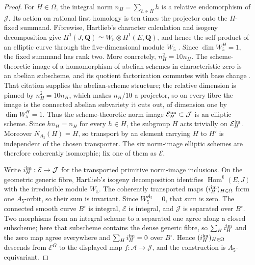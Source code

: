 \begin{proof}
For \(H\in\Omega\), the integral norm
\(n_H=\sum_{h\in H}h\) is a relative endomorphism of \(\mathcal J\).  Its
action on rational first homology is ten times the projector onto the
\(H\)-fixed summand.  Fibrewise, Hartlieb's character calculation and
isogeny decomposition give
\(H^1(J,\mathbf Q)\simeq W_5\otimes H^1(E,\mathbf Q)\), and hence the
self-product of an elliptic curve through the five-dimensional module
\(W_5\) \cite[Lemma~5.5 and Remark~5.8]{Hartlieb}.  Since
\(\dim W_5^H=1\), the fixed summand has rank two.  More concretely,
\(n_H^2=10n_H\).  The scheme-theoretic image of a homomorphism of abelian
schemes in characteristic zero is an abelian subscheme, and its quotient
factorization commutes with base change
\cite[Theorem~A]{ACMW}.  That citation supplies the abelian-scheme structure;
the relative dimension is pinned by \(n_H^2=10n_H\), which makes
\(n_H/10\) a projector, so on every fibre the image is the connected abelian
subvariety it cuts out, of dimension one by \(\dim W_5^H=1\).  Thus the
scheme-theoretic norm image \(\mathcal E_H^{\rm im}\subset\mathcal J\) is
an elliptic scheme.  Since \(hn_H=n_H\) for every
\(h\in H\), the subgroup \(H\) acts trivially on \(\mathcal E_H^{\rm im}\).  Moreover
\(N_{A_5}(H)=H\), so transport by an element carrying \(H\) to \(H'\) is
independent of the chosen transporter.  The six norm-image elliptic schemes are therefore coherently isomorphic;
fix one of them as \(\mathcal E\).

Write \(i_H^{\rm im}:\mathcal E\to\mathcal J\) for the transported
primitive norm-image inclusions.  On the geometric generic fibre, Hartlieb's isogeny decomposition
identifies \(\operatorname{Hom}^0(E,J)\) with the irreducible module \(W_5\).
The coherently transported maps \((i_H^{\rm im})_{H\in\Omega}\) form one
\(A_5\)-orbit,
so their sum is invariant.  Since \(W_5^{A_5}=0\), that sum is zero.  The
connected smooth curve \(B^\circ\) is integral, \(\mathcal E\) is integral,
and \(\mathcal J\) is separated over \(B^\circ\).  Two morphisms from an
integral scheme to a separated one agree along a closed subscheme; here that
subscheme contains the dense generic fibre, so \(\sum_Hi_H^{\rm im}\) and the zero map agree everywhere and
\(\sum_Hi_H^{\rm im}=0\) over \(B^\circ\).  Hence
\((i_H^{\rm im})_{H\in\Omega}\) descends from
\(\mathcal E^\Omega\) to the displayed map
\(f:\mathcal A\to\mathcal J\), and the construction is
\(A_5\)-equivariant.


\end{proof}
